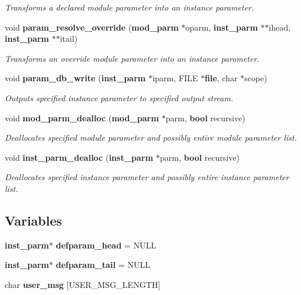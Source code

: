 \begin{CompactItemize}
\begin{CompactList}\small\item\em Transforms a declared module parameter into an instance parameter.\item\end{CompactList}\item 
void {\bf param\_\-resolve\_\-override} ({\bf mod\_\-parm} $\ast$oparm, {\bf inst\_\-parm} $\ast$$\ast$ihead, {\bf inst\_\-parm} $\ast$$\ast$itail)
\begin{CompactList}\small\item\em Transforms an override module parameter into an instance parameter.\item\end{CompactList}\item 
void {\bf param\_\-db\_\-write} ({\bf inst\_\-parm} $\ast$iparm, FILE $\ast${\bf file}, char $\ast$scope)
\begin{CompactList}\small\item\em Outputs specified instance parameter to specified output stream.\item\end{CompactList}\item 
void {\bf mod\_\-parm\_\-dealloc} ({\bf mod\_\-parm} $\ast$parm, {\bf bool} recursive)
\begin{CompactList}\small\item\em Deallocates specified module parameter and possibly entire module parameter list.\item\end{CompactList}\item 
void {\bf inst\_\-parm\_\-dealloc} ({\bf inst\_\-parm} $\ast$parm, {\bf bool} recursive)
\begin{CompactList}\small\item\em Deallocates specified instance parameter and possibly entire instance parameter list.\item\end{CompactList}\end{CompactItemize}
\subsection*{Variables}
\begin{CompactItemize}
\item 
{\bf inst\_\-parm}$\ast$ {\bf defparam\_\-head} = NULL
\item 
{\bf inst\_\-parm}$\ast$ {\bf defparam\_\-tail} = NULL
\item 
char {\bf user\_\-msg} [USER\_\-MSG\_\-LENGTH]
\end{CompactItemize}


